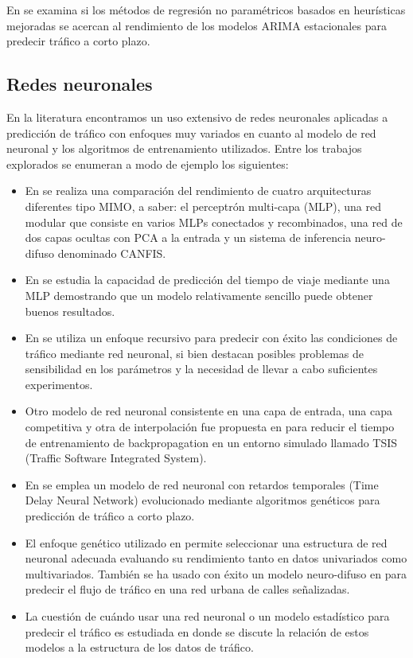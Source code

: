 \documentclass{llncs}
\begin{document}
En \cite{smith2002comparison} se examina si los métodos de regresión no paramétricos basados en heurísticas mejoradas se acercan al rendimiento de los modelos ARIMA estacionales para predecir tráfico a corto plazo.


\subsection{Redes neuronales}

En la literatura encontramos un uso extensivo de redes neuronales aplicadas a predicción de tráfico con enfoques muy variados en cuanto al modelo de red neuronal y los algoritmos de entrenamiento utilizados. Entre los trabajos explorados se enumeran a modo de ejemplo los siguientes:
\begin{itemize}

\item En \cite{Ishak2004452} se realiza una comparación del rendimiento de cuatro arquitecturas diferentes tipo MIMO, a saber: el perceptrón multi-capa (MLP), una red modular que consiste en varios MLPs conectados y recombinados, una red de dos capas ocultas con PCA a la entrada y un sistema de inferencia neuro-difuso denominado CANFIS.

\item En \cite{Innamaa2005649} se estudia la capacidad de predicción del tiempo de viaje mediante una MLP demostrando que un modelo relativamente sencillo puede obtener buenos resultados.

\item En \cite{Zhang2000472} se utiliza un enfoque recursivo para predecir con éxito las condiciones de tráfico mediante red neuronal, si bien destacan posibles problemas de sensibilidad en los parámetros y la necesidad de llevar a cabo suficientes experimentos.

\item Otro modelo de red neuronal consistente en una capa de entrada, una capa competitiva y otra de interpolación fue  propuesta en \cite{Dharia2003607} para reducir el tiempo de entrenamiento de backpropagation en un entorno simulado llamado TSIS (Traffic Software Integrated System). 

\item En \cite{abdulhai2002short} se emplea un modelo de red neuronal con retardos temporales (Time Delay Neural Network) evolucionado mediante algoritmos genéticos para predicción de tráfico a corto plazo.

\item El enfoque genético utilizado en \cite{vlahogianni2005optimized} permite seleccionar una estructura de red neuronal adecuada evaluando su rendimiento tanto en datos univariados como multivariados.
También se ha usado con éxito un modelo neuro-difuso en \cite{yin2002urban} para predecir el flujo de tráfico en una red urbana de calles señalizadas.

\item La cuestión de cuándo usar una red neuronal o un modelo estadístico para predecir el tráfico es estudiada en \cite{kirby1997should} donde se discute la relación de estos modelos a la estructura de los datos de tráfico.


\end{itemize}
\end{document}
